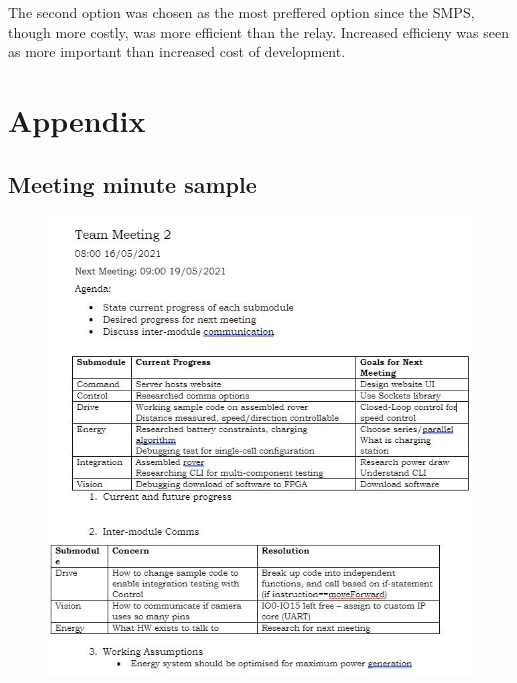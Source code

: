 \documentclass[11pt, a4paper]{article}
\begin{document}
The second option was chosen as the most preffered option since the SMPS, though more costly, was more efficient than the relay. Increased efficieny was seen as more important than increased cost of development.

\pagebreak
\printbibliography[heading=bibnumbered, title={References}]


\pagebreak
\section{Appendix}

\subsection{Meeting minute sample}

\begin{figure} [h!]
    \centering
    \includegraphics[scale=0.8]{Minute_sample.JPG}
\end{figure}
\end{document}
